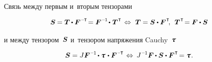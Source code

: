 \begin{otherlanguage}{russian}
Связь между первым и~вторым тензорами

\nopagebreak\vspace{-0.12em}\begin{equation*}
\secondpiolakirchhoffstress \hspace{-0.1ex}
= \firstpiolakirchhoffstress \hspace{-0.1ex} \dotp \bm{F}^{\hspace{.1ex}\expminusT} \hspace{-0.4ex}
= \bm{F}^{\hspace{.1ex}\expminusone} \hspace{-0.3ex} \dotp \hspace{.1ex} \firstpiolakirchhoffstress^{\hspace{.1ex}\T}
%
\hspace{.25ex} \Leftrightarrow \hspace{.75ex}
%
\firstpiolakirchhoffstress = \secondpiolakirchhoffstress \dotp \bm{F}^{\hspace{.1ex}\T}
\hspace{-0.4ex} , \:\:
\firstpiolakirchhoffstress^{\hspace{.1ex}\T} \hspace{-0.4ex} = \bm{F} \dotp \secondpiolakirchhoffstress
\end{equation*}

\vspace{-0.2em} \noindent и между тензором~$\bm{S}$ и~тензором напряжения Cauchy~$\cauchystress$

\nopagebreak\vspace{-0.12em}\begin{equation*}
\secondpiolakirchhoffstress = J \bm{F}^{\hspace{.1ex}\expminusone} \hspace{-0.2ex} \dotp \cauchystress \hspace{.16ex} \dotp \bm{F}^{\hspace{.1ex}\expminusT}
\hspace{.2ex} \Leftrightarrow \hspace{.5ex}
J^{\hspace{.12ex}\expminusone} \bm{F} \hspace{-0.1ex} \dotp \secondpiolakirchhoffstress \dotp \bm{F}^{\hspace{.1ex}\T} \hspace{-0.32ex}
= \cauchystress \hspace{.1ex}.
\end{equation*}


\end{otherlanguage}
